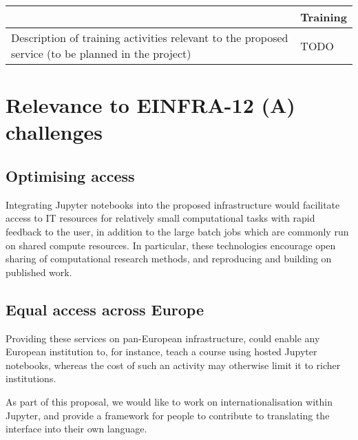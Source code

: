 \begin{tabular}{|p{7cm}|l|}
  &Training
  \\\hline
  Description of training activities relevant to the proposed service (to be planned in the project)&TODO
  \\\hline
\end{tabular}



\section{Relevance to EINFRA-12 (A) challenges}


\subsection{Optimising access}

Integrating Jupyter notebooks into the proposed infrastructure would facilitate
access to IT resources for relatively small computational tasks with rapid
feedback to the user, in addition to the large batch jobs which are commonly
run on shared compute resources. In particular, these technologies encourage
open sharing of computational research methods, and reproducing and building on
published work.


\subsection{Equal access across Europe}

Providing these services on pan-European infrastructure, could enable any
European institution to, for instance, teach a course using hosted Jupyter
notebooks, whereas the cost of such an activity may otherwise limit it to richer
institutions.

As part of this proposal, we would like to work on internationalisation within
Jupyter, and provide a framework for people to contribute to translating the
interface into their own language.



